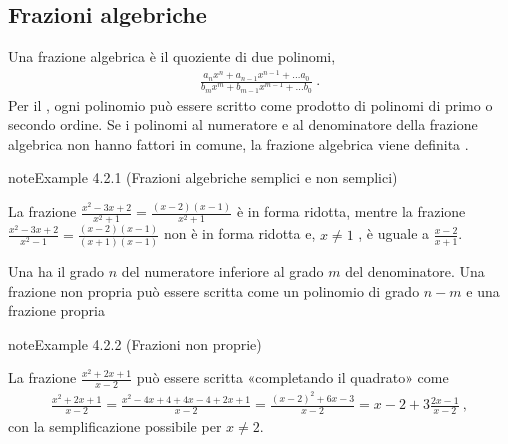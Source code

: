 \documentclass[letterpaper,10pt,italian]{jupyterBook}
\begin{document}
\subsection{Frazioni algebriche}
\label{\detokenize{ch/algebra/real-algebra:frazioni-algebriche}}
\sphinxAtStartPar
Una frazione algebrica è il quoziente di due polinomi,
\begin{equation*}
\begin{split}\frac{a_n x^n + a_{n-1} x^{n-1} + \dots a_0}{b_m x^m + b_{m-1} x^{m-1} + \dots b_0} \ .\end{split}
\end{equation*}
\sphinxAtStartPar
Per il {\hyperref[\detokenize{ch/precalculus/polynomials:math-hs-precalculus-polynomials-alg-fund-thm}]{}}, ogni polinomio può essere scritto come prodotto di polinomi di primo o secondo ordine. Se i polinomi al numeratore e al denominatore della frazione algebrica non hanno fattori in comune, la frazione algebrica viene definita .
\label{ch/algebra/real-algebra:example-0}
\begin{sphinxadmonition}{note}{Example 4.2.1 (Frazioni algebriche semplici e non semplici)}



\sphinxAtStartPar
La frazione \(\frac{x^2-3x+2}{x^2+1} = \frac{(x-2)(x-1)}{x^2+1}\) è in forma ridotta, mentre la frazione \(\frac{x^2-3x+2}{x^2-1} = \frac{(x-2)(x-1)}{(x+1)(x-1)}\) non è in forma ridotta e,  \(x \ne 1\) \sphinxstylestrong{(!)}, è uguale a \(\frac{x-2}{x+1}\).
\end{sphinxadmonition}

\sphinxAtStartPar
Una  ha il grado \(n\) del numeratore inferiore al grado \(m\) del denominatore. Una frazione non propria può essere scritta come un polinomio di grado \(n-m\) e una frazione propria
\label{ch/algebra/real-algebra:example-1}
\begin{sphinxadmonition}{note}{Example 4.2.2 (Frazioni non proprie)}



\sphinxAtStartPar
La frazione \(\frac{x^2 + 2x + 1}{x - 2}\) può essere scritta «completando il quadrato» come
\begin{equation*}
\begin{split}\frac{x^2+2x+1}{x-2} = \frac{x^2-4x+4+4x-4+2x+1}{x-2} = \frac{(x-2)^2+6x-3}{x-2} = x-2 + 3\frac{2x-1}{x-2} \ ,\end{split}
\end{equation*}
\sphinxAtStartPar
con la semplificazione possibile per \(x \ne 2\).
\end{sphinxadmonition}
\end{document}
